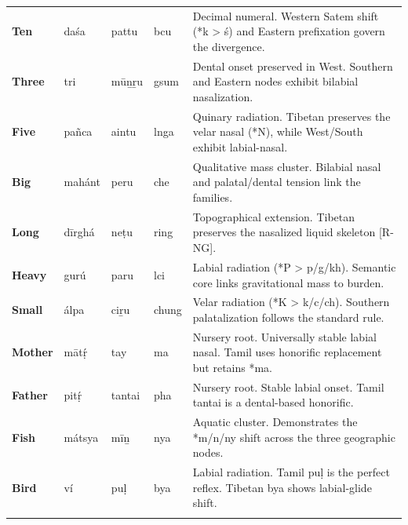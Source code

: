 \begin{longtable}{p{} p{} p{} p{} p{}}
\textbf{Ten} & daśa & pattu & bcu & \small Decimal numeral. Western Satem shift (*k > ś) and Eastern prefixation govern the divergence. \\ 
\addlinespace[10pt]

\textbf{Three} & tri & mūṉṟu & gsum & \small Dental onset preserved in West. Southern and Eastern nodes exhibit bilabial nasalization. \\ 
\addlinespace[10pt]

\textbf{Five} & pañca & aintu & lnga & \small Quinary radiation. Tibetan preserves the velar nasal (*N), while West/South exhibit labial-nasal. \\ 
\addlinespace[10pt]

\textbf{Big} & mahánt & peru & che & \small Qualitative mass cluster. Bilabial nasal and palatal/dental tension link the families. \\ 
\addlinespace[10pt]

\textbf{Long} & dīrghá & neṭu & ring & \small Topographical extension. Tibetan preserves the nasalized liquid skeleton [R-NG]. \\ 
\addlinespace[10pt]

\textbf{Heavy} & gurú & paru & lci & \small Labial radiation (*P > p/g/kh). Semantic core links gravitational mass to burden. \\ 
\addlinespace[10pt]

\textbf{Small} & álpa & ciṟu & chung & \small Velar radiation (*K > k/c/ch). Southern palatalization follows the standard rule. \\ 
\addlinespace[10pt]

\textbf{Mother} & mātṛ́ & tay & ma & \small Nursery root. Universally stable labial nasal. Tamil uses honorific replacement but retains *ma. \\ 
\addlinespace[10pt]

\textbf{Father} & pitṛ́ & tantai & pha & \small Nursery root. Stable labial onset. Tamil tantai is a dental-based honorific. \\ 
\addlinespace[10pt]

\textbf{Fish} & mátsya & mīṉ & nya & \small Aquatic cluster. Demonstrates the *m/n/ny shift across the three geographic nodes. \\ 
\addlinespace[10pt]

\textbf{Bird} & ví & puḷ & bya & \small Labial radiation. Tamil puḷ is the perfect reflex. Tibetan bya shows labial-glide shift. \\ 
\addlinespace[10pt]


\end{longtable}
